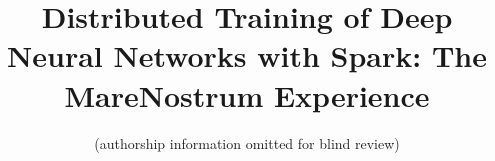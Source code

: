 \documentclass[journal]{IEEEtran}
\begin{document}
\title{Distributed Training of Deep Neural Networks with Spark: The MareNostrum Experience}

%

%                       

\author{
		(authorship information omitted for blind review)

                       
}


%


\maketitle\thispagestyle{empty}
\end{document}
